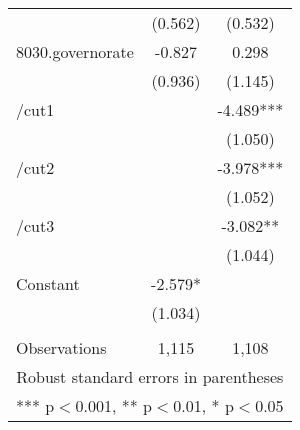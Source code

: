 \documentclass[]{article}
\begin{document}
\begin{tabular}{lcc}
 & (0.562) & (0.532) \\
8030.governorate & -0.827 & 0.298 \\
 & (0.936) & (1.145) \\
/cut1 &  & -4.489*** \\
 &  & (1.050) \\
/cut2 &  & -3.978*** \\
 &  & (1.052) \\
/cut3 &  & -3.082** \\
 &  & (1.044) \\
Constant & -2.579* &  \\
 & (1.034) &  \\
 &  &  \\
 Observations & 1,115 & 1,108 \\ \hline
\multicolumn{3}{c}{ Robust standard errors in parentheses} \\
\multicolumn{3}{c}{ *** p$<$0.001, ** p$<$0.01, * p$<$0.05} \\
\end{tabular}
\end{document}
